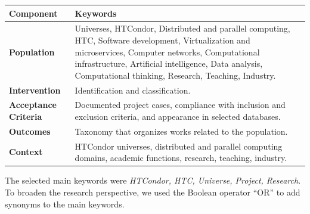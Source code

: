\begin{table}
	{\begin{tabular}{p{3.5cm}p{6.0cm}} \toprule
			\textbf{Component}           & \textbf{Keywords}                                                                                                                                                                                                                                                    \\
			\midrule
			\textbf{Population}          & Universes, HTCondor, Distributed and parallel computing, HTC, Software development, Virtualization and microservices, Computer networks, Computational infrastructure, Artificial intelligence, Data analysis, Computational thinking, Research, Teaching, Industry. \\[0.5em]
			\textbf{Intervention}        & Identification and classification.                                                                                                                                                                                                                                   \\[0.5em]
			\textbf{Acceptance Criteria} & Documented project cases, compliance with inclusion and exclusion criteria, and appearance in selected databases.                                                                                                                                                    \\[0.5em]
			\textbf{Outcomes}            & Taxonomy that organizes works related to the population.                                                                                                                                                                                                             \\[0.5em]
			\textbf{Context}             & HTCondor universes, distributed and parallel computing domains, academic functions, research, teaching, industry.                                                                                                                                                    \\
			\bottomrule
		\end{tabular}}
	\label{table:picoc_keywords}
\end{table}


The selected main keywords were \textit{HTCondor, HTC, Universe, Project, Research}. To broaden the research perspective, we used the Boolean operator ``OR'' to add synonyms to the main keywords.

